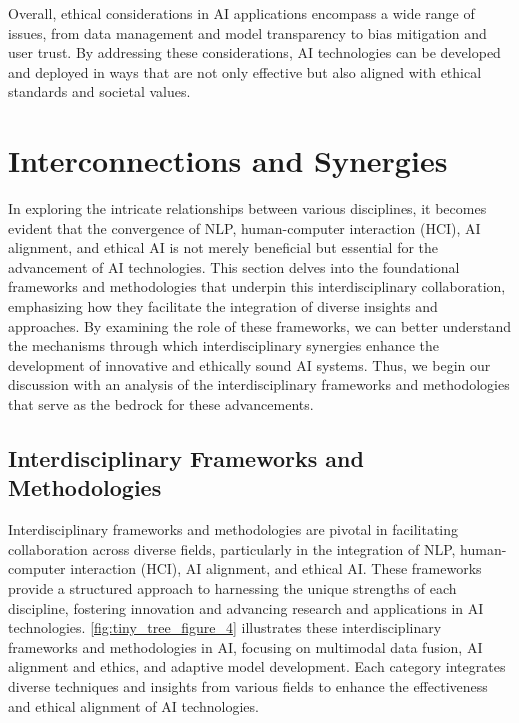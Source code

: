 Overall, ethical considerations in AI applications encompass a wide range of issues, from data management and model transparency to bias mitigation and user trust. By addressing these considerations, AI technologies can be developed and deployed in ways that are not only effective but also aligned with ethical standards and societal values.













\section{Interconnections and Synergies} \label{sec:Interconnections and Synergies}

In exploring the intricate relationships between various disciplines, it becomes evident that the convergence of NLP, human-computer interaction (HCI), AI alignment, and ethical AI is not merely beneficial but essential for the advancement of AI technologies. This section delves into the foundational frameworks and methodologies that underpin this interdisciplinary collaboration, emphasizing how they facilitate the integration of diverse insights and approaches. By examining the role of these frameworks, we can better understand the mechanisms through which interdisciplinary synergies enhance the development of innovative and ethically sound AI systems. Thus, we begin our discussion with an analysis of the interdisciplinary frameworks and methodologies that serve as the bedrock for these advancements.






\subsection{Interdisciplinary Frameworks and Methodologies} \label{subsec:Interdisciplinary Frameworks and Methodologies}

Interdisciplinary frameworks and methodologies are pivotal in facilitating collaboration across diverse fields, particularly in the integration of NLP, human-computer interaction (HCI), AI alignment, and ethical AI. These frameworks provide a structured approach to harnessing the unique strengths of each discipline, fostering innovation and advancing research and applications in AI technologies. \autoref{fig:tiny_tree_figure_4} illustrates these interdisciplinary frameworks and methodologies in AI, focusing on multimodal data fusion, AI alignment and ethics, and adaptive model development. Each category integrates diverse techniques and insights from various fields to enhance the effectiveness and ethical alignment of AI technologies.


